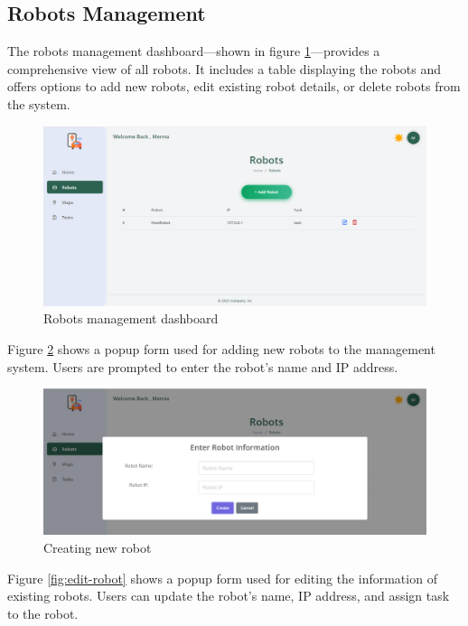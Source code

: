 \subsection{Robots Management}

    The robots management dashboard---shown in figure \ref{fig:robots-dashboard}---provides a comprehensive view of all robots. It includes a table displaying the robots and offers options to add new robots, edit existing robot details, or delete robots from the system.

    \begin{figure}[h!]
        \centering
        \includegraphics[scale=0.31]{Figures/WebApp/Robots.png}
        \caption{Robots management dashboard}
        \label{fig:robots-dashboard}
    \end{figure}


    Figure \ref{fig:create-robot} shows a popup form used for adding new robots to the management system. Users are prompted to enter the robot's name and IP address.

    \begin{figure}[h!]
        \centering
        \includegraphics[scale=0.31]{Figures/WebApp/createRobot.png}
        \caption{Creating new robot}
        \label{fig:create-robot}
    \end{figure}

    Figure \ref{fig:edit-robot} shows a popup form used for editing the information of existing robots. Users can update the robot's name, IP address, and assign task to the robot.

